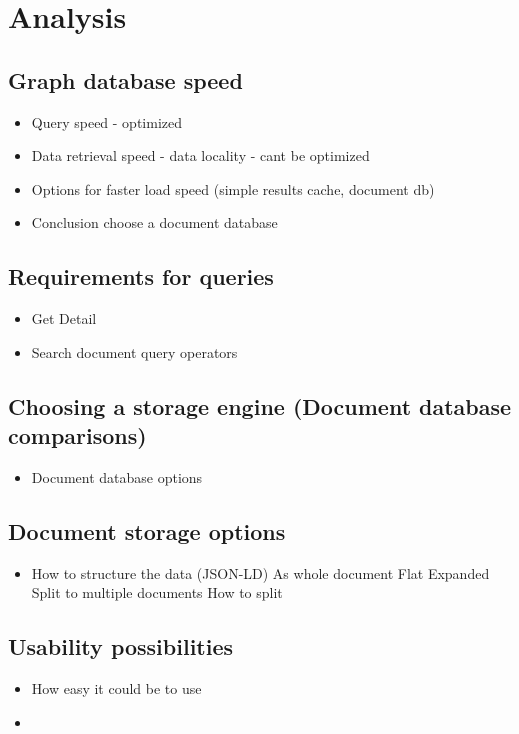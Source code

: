 \chapter{Analysis}

\section{Graph database speed}

\begin{itemize}
	\item Query speed - optimized
	\item Data retrieval speed - data locality - cant be optimized
	\item Options for faster load speed (simple results cache, document db)
	\item Conclusion choose a document database
\end{itemize}

\section{Requirements for queries}
\begin{itemize}
	\item Get Detail
	\item Search document query operators
			
\end{itemize}

\section{Choosing a storage engine (Document database comparisons)}
\begin{itemize}
	\item Document database options
\end{itemize}

\section{Document storage options}
\begin{itemize}
	\item How to structure the data (JSON-LD)
		\subitem As whole document
			\subsubitem Flat
			\subsubitem Expanded
		\subitem Split to multiple documents
			\subsubitem How to split
\end{itemize}

\section{Usability possibilities}
\begin{itemize}
	\item How easy it could be to use
	\item 
\end{itemize}








